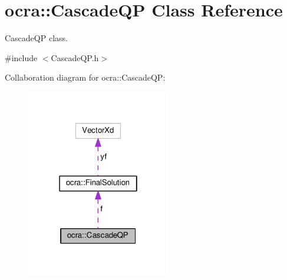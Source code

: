 \hypertarget{classocra_1_1CascadeQP}{}\section{ocra\+:\+:Cascade\+QP Class Reference}
\label{classocra_1_1CascadeQP}


Cascade\+QP class.  




{\ttfamily \#include $<$Cascade\+Q\+P.\+h$>$}



Collaboration diagram for ocra\+:\+:Cascade\+QP\+:
\nopagebreak
\begin{figure}[H]
\begin{center}
\leavevmode
\includegraphics[width=178pt]{d6/d63/classocra_1_1CascadeQP__coll__graph}
\end{center}
\end{figure}
